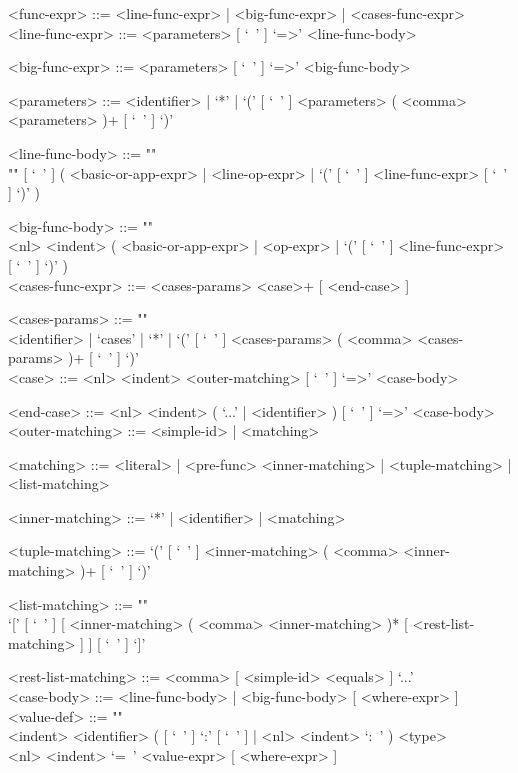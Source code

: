 \documentclass[diploma]{softlab-thesis}
\begin{document}
\begin{grammar}
<func-expr> ::= <line-func-expr> | <big-func-expr> | <cases-func-expr>
\\

<line-func-expr> ::= <parameters> [ `\ ' ] `=>' <line-func-body>

<big-func-expr> ::= <parameters> [ `\ ' ] `=>' <big-func-body>

<parameters> ::=
<identifier> | `*' |
`(' [ `\ ' ] <parameters> ( <comma> <parameters> )+ [ `\ ' ] `)'

<line-func-body> ::= ""\\""
[ `\ ' ]
(
<basic-or-app-expr> | <line-op-expr> |
`(' [ `\ ' ] <line-func-expr> [ `\ ' ] `)'
)

<big-func-body> ::= ""\\
<nl> <indent>
(
<basic-or-app-expr> | <op-expr> | `(' [ `\ ' ] <line-func-expr> [ `\ ' ] `)'
)
\\

<cases-func-expr> ::= <cases-params> <case>+ [ <end-case> ]

<cases-params> ::= ""\\
<identifier> | `cases' | `*' |
`(' [ `\ ' ] <cases-params> ( <comma> <cases-params> )+ [ `\ ' ] `)'
\\

<case> ::=  <nl> <indent> <outer-matching> [ `\ ' ] `=>' <case-body>

<end-case> ::=
<nl> <indent> ( `...' | <identifier> ) [ `\ ' ] `=>' <case-body>
\\

<outer-matching> ::= <simple-id> | <matching>

<matching> ::=
<literal> | <pre-func> <inner-matching> | <tuple-matching> | <list-matching>

<inner-matching> ::= `*' | <identifier> | <matching>

<tuple-matching> ::=
`(' [ `\ ' ] <inner-matching> ( <comma> <inner-matching> )+ [ `\ ' ] `)'

<list-matching> ::= ""\\
`[' [ `\ ' ]
[ <inner-matching> ( <comma> <inner-matching> )* [ <rest-list-matching> ] ]
[ `\ ' ] `]'

<rest-list-matching> ::= <comma> [ <simple-id> <equals> ] `...'
\\

<case-body> ::= <line-func-body> | <big-func-body> [ <where-expr> ]
\\

\newpage
<value-def> ::= ""\\
<indent> <identifier>
( [ `\ ' ] `:' [ `\ ' ] | <nl> <indent> `:\ ' ) <type>  \\
<nl> <indent> `=\ ' <value-expr> [ <where-expr> ]


\end{grammar}
\end{document}

